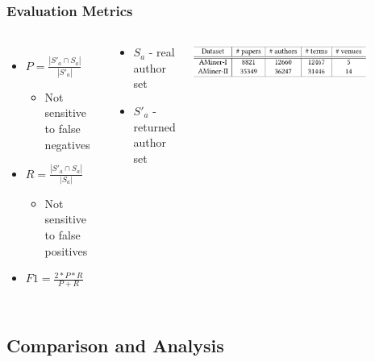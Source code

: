 \begin{frame}
\frametitle{Evaluation Metrics}
\begin{columns}

\begin{itemize}
    \item $P = \frac{|S'_a \cap S_a|}{|S'_a|}$
    \begin{itemize}
        \item Not sensitive to false negatives
    \end{itemize} 
    \item $R = \frac{|S'_a \cap S_a|}{|S_a|}$
    \begin{itemize}
        \item Not sensitive to false positives
    \end{itemize} 
    \item $F1 = \frac{2*P*R}{P+R}$
\end{itemize}

\begin{block}{}
    \begin{itemize}
        \item $S_a$ - real author set
        \item $S'_a$ - returned author set
    \end{itemize}
\end{block}

\includegraphics[width=0.8\textwidth]{img/datasets}
\end{columns}
\end{frame}
\subsection{Comparison and Analysis}

